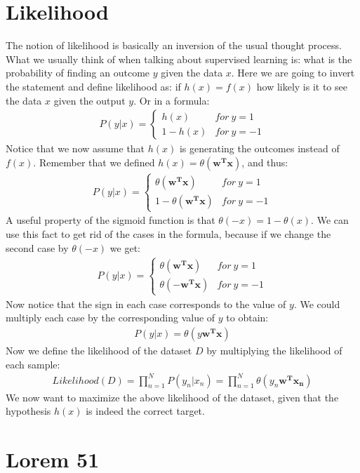 \section{Likelihood}
The notion of likelihood is basically an inversion of the usual thought process. What we usually think of when talking about supervised learning is: what is the probability of finding an outcome $y$ given the data $x$. Here we are going to invert the statement and define likelihood as: if $h(x) = f(x)$ how likely is it to see the data $x$ given the output $y$. Or in a formula:
\begin{equation}
\begin{split}
P(y | x) =
\begin{cases} 
h(x) & for\ y=1 \\
1-h(x) & for\ y=-1 
\end{cases}
\end{split}
\end{equation}
Notice that we now assume that $h(x)$ is generating the outcomes instead of $f(x)$.
Remember that we defined $h(x) = \theta(\bm{w^{T}x})$, and thus:
\begin{equation}
\begin{split}
P(y | x) =
\begin{cases} 
\theta(\bm{w^{T}x}) & for\ y=1 \\
1-\theta(\bm{w^{T}x}) & for\ y=-1 
\end{cases}
\end{split}
\end{equation}
A useful property of the sigmoid function is that $\theta(-x) = 1-\theta(x)$. We can use this fact to get rid of the cases in the formula, because if we change the second case by $\theta(-x)$ we get:
\begin{equation}
\begin{split}
P(y | x) =
\begin{cases} 
\theta(\bm{w^{T}x}) & for\ y=1 \\
\theta(\bm{-w^{T}x}) & for\ y=-1 
\end{cases}
\end{split}
\end{equation}
Now notice that the sign in each case corresponds to the value of $y$. We could multiply each case by the corresponding value of $y$ to obtain:
\begin{equation}
\begin{split}
P(y | x) = \theta(y\bm{w^{T}x})
\end{split}
\end{equation}
Now we define the likelihood of the dataset $D$ by multiplying the likelihood of each sample:
\begin{equation}
\begin{split}
Likelihood(D) = \prod_{n=1}^{N}P(y_{n}|x_{n}) = \prod_{n=1}^{N}\theta(y_{n}\bm{w^{T}x_{n}})
\end{split}
\end{equation}
We now want to maximize the above likelihood of the dataset, given that the hypothesis $h(x)$ is indeed the correct target.

\section{Lorem 51}
\lipsum[51]


